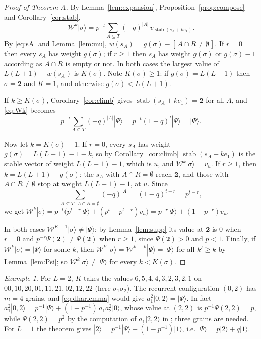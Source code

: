 \documentclass[11pt]{amsart}
\theoremstyle{definition}
\theoremstyle{remark}
\newtheorem{example}[theorem]{Example}
\newcommand{\cW}{\mathcal{W}}
\newcommand{\stab}{\operatorname{stab}}
\newcommand{\ket}[1]{|#1\rangle}
\newcommand{\two}{\mathbf{2}}
\newcommand{\Ind}[1]{[\,#1\,]}
\begin{document}
\begin{proof}[Proof of Theorem A]
By Lemma~\ref{lem:expansion}, Proposition~\ref{prop:compose} and Corollary~\ref{cor:stab},
\begin{equation}\label{eq:Wk}
\cW^k\ket\sigma=p^{-t}\sum_{A\subseteq T}(-q)^{|A|}\,v_{\stab(s_A+ke_1)} .
\end{equation}
By \eqref{eq:sA} and Lemma~\ref{lem:mu}, $w(s_A)=g(\sigma)-\Ind{A\cap R\ne\emptyset}$. If $r=0$ then every $s_A$ has weight $g(\sigma)$; if $r\ge1$ then $s_A$ has weight $g(\sigma)$ or $g(\sigma)-1$ according as $A\cap R$ is empty or not. In both cases the largest value of $L(L+1)-w(s_A)$ is $K(\sigma)$. Note $K(\sigma)\ge1$: if $g(\sigma)=L(L+1)$ then $\sigma=\two$ and $K=1$, and otherwise $g(\sigma)<L(L+1)$.

If $k\ge K(\sigma)$, Corollary~\ref{cor:climb} gives $\stab(s_A+ke_1)=\two$ for all $A$, and \eqref{eq:Wk} becomes \[
p^{-t}\sum_{A\subseteq T}(-q)^{|A|}\ket\Psi=p^{-t}(1-q)^t\ket\Psi=\ket\Psi .
\]

Now let $k=K(\sigma)-1$. If $r=0$, every $s_A$ has weight $g(\sigma)=L(L+1)-1-k$, so by Corollary~\ref{cor:climb} $\stab(s_A+ke_1)$ is the stable vector of weight $L(L+1)-1$, which is $u$, and $\cW^k\ket\sigma=v_u$. If $r\ge1$, then $k=L(L+1)-g(\sigma)$; the $s_A$ with $A\cap R=\emptyset$ reach $\two$, and those with $A\cap R\ne\emptyset$ stop at weight $L(L+1)-1$, at $u$. Since
\[
\sum_{A\subseteq T,\ A\cap R=\emptyset}(-q)^{|A|}=(1-q)^{t-r}=p^{t-r},
\]
we get $\cW^k\ket\sigma=p^{-t}\bigl(p^{t-r}\ket\Psi+(p^t-p^{t-r})v_u\bigr)=p^{-r}\ket\Psi+(1-p^{-r})v_u$.

In both cases $\cW^{K-1}\ket\sigma\ne\ket\Psi$: by Lemma~\ref{lem:supp} its value at $\two$ is $0$ when $r=0$ and $p^{-r}\Psi(\two)\ne\Psi(\two)$ when $r\ge1$, since $\Psi(\two)>0$ and $p<1$. Finally, if $\cW^k\ket\sigma=\ket\Psi$ for some $k$, then $\cW^{k'}\ket\sigma=\cW^{k'-k}\ket\Psi=\ket\Psi$ for all $k'\ge k$ by Lemma~\ref{lem:Psi}; so $\cW^k\ket\sigma\ne\ket\Psi$ for every $k<K(\sigma)$.
\end{proof}

\begin{example}
For $L=2$, $K$ takes the values $6,5,4,4,3,2,3,2,1$ on $00,10,20,01,11,21,02,12,22$ (here $\sigma_1\sigma_2$). The recurrent configuration $(0,2)$ has $m=4$ grains, and \eqref{eq:dharlemma} would give $a_1^2\ket{0,2}=\ket\Psi$. In fact $a_1^2\ket{0,2}=p^{-1}\ket\Psi+(1-p^{-1})\,a_1a_2^2\ket{0}$, whose value at $(2,2)$ is $p^{-1}\Psi(2,2)=p$, while $\Psi(2,2)=p^2$ by the computation of $a_1\ket{2,2}$ in \cite[Section~4]{Dha04}; three grains are needed. For $L=1$ the theorem gives $\ket2=p^{-1}\ket\Psi+(1-p^{-1})\ket1$, i.e. $\ket\Psi=p\ket2+q\ket1$.
\end{example}
\end{document}
